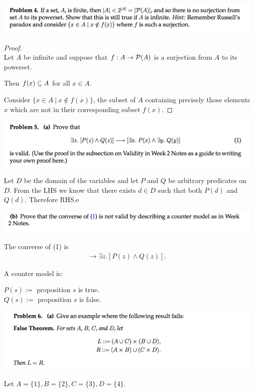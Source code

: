 \documentclass[12pt]{article}
\begin{document}
\begin{mdframed}
\includegraphics[width=400pt]{img/MIT-math-for-cs-2005-set-1-4.png}
\end{mdframed}

\begin{proof}~\\ 
  Let $A$ be infinite and suppose that $f:A \to \mathcal P(A)$ is a surjection from $A$ to its powerset.

  Then $f(x) \subseteq A$ for all $x \in A$.

  Consider $\{x \in A ~|~ x \notin f(x)\}$, the subset of $A$ containing precisely those elements
  $x$ which are not in their corresponding subset $f(x)$.
\end{proof}

\begin{mdframed}
\includegraphics[width=400pt]{img/MIT-math-for-cs-2005-set-1-5.png}
\end{mdframed}
Let $D$ be the domain of the variables and let $P$ and $Q$ be arbitrary predicates on $D$. From the
LHS we know that there exists $d \in D$ such that both $P(d)$ and $Q(d)$. Therefore RHS.e

\begin{mdframed}
\includegraphics[width=400pt]{img/MIT-math-for-cs-2005-set-1-5-b.png}
\end{mdframed}
The converse of (1) is
\begin{align*}
  [\exists x. P(x) \land \exists y. Q(y)] \rightarrow \exists z. [P(z) \land Q(z)].
\end{align*}

A counter model is:

$P(s) := $ proposition $s$ is true.\\
$Q(s) := $ proposition $s$ is false.


\begin{mdframed}
\includegraphics[width=400pt]{img/MIT-math-for-cs-2005-set-1-6-a.png}
\end{mdframed}
Let $A = \{1\}, B = \{2\}, C = \{3\}, D=\{4\}$.
\end{document}
